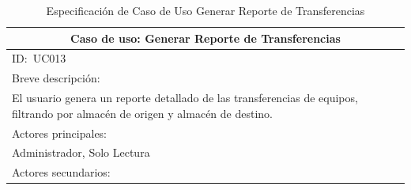 \documentclass[stu, 12pt, letterpaper, donotrepeattitle, floatsintext, natbib]{apa7}
\begin{document}
\begin{longtable}{@{} p{16.5cm} @{}}
    \caption{Especificaci\'on de Caso de Uso Generar Reporte de Transferencias}\label{tab:UC013}                                                                                                                                                                                        \\ \toprule
    \multicolumn{1}{c}{Caso de uso: Generar Reporte de Transferencias}                                                                                                                                                                                                                  \\ \midrule
    ID:~UC013                                                                                                                                                                                                                                                                           \\ \midrule
    Breve descripci\'on:                                                                                                                                                                                                                                                                \\
    El usuario genera un reporte detallado de las transferencias de equipos, filtrando por almac\'en de origen y almac\'en de destino.                                                                                                                                                  \\ \midrule
    Actores principales:                                                                                                                                                                                                                                                                \\
    Administrador, Solo Lectura                                                                                                                                                                                                                                                         \\ \midrule
    Actores secundarios:                                                                                                                                                                                                                                                                \\

\end{longtable}
\end{document}

